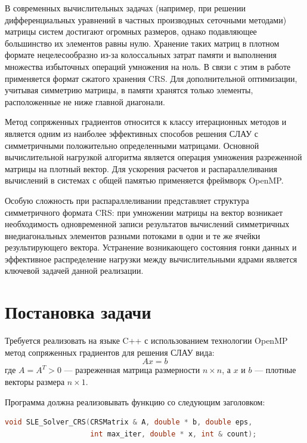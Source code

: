 \documentclass[12pt, a4paper]{article}
\begin{document}
В современных вычислительных задачах (например, при решении дифференциальных уравнений в частных производных сеточными методами) 
матрицы систем достигают огромных размеров, однако подавляющее большинство их элементов равны нулю. 
Хранение таких матриц в плотном формате нецелесообразно из-за колоссальных затрат памяти и 
выполнения множества избыточных операций умножения на ноль. В связи с этим в работе применяется формат сжатого хранения CRS. 
Для дополнительной оптимизации, учитывая симметрию матрицы, 
в памяти хранятся только элементы, расположенные не ниже главной диагонали.

Метод сопряженных градиентов относится к классу итерационных методов и является одним из наиболее эффективных способов решения СЛАУ с симметричными положительно определенными матрицами. 
Основной вычислительной нагрузкой алгоритма является операция умножения разреженной матрицы на плотный вектор. 
Для ускорения расчетов и распараллеливания вычислений в системах с общей памятью применяется фреймворк OpenMP. 

Особую сложность при распараллеливании представляет структура симметричного формата CRS: при умножении матрицы на вектор возникает необходимость одновременной записи результатов вычислений симметричных 
внедиагональных элементов разными потоками в одни и те же ячейки результирующего вектора. Устранение возникающего состояния гонки данных и эффективное распределение нагрузки между вычислительными 
ядрами является ключевой задачей данной реализации.

\section{Постановка задачи}
Требуется реализовать на языке C++ с использованием технологии OpenMP метод сопряженных градиентов для решения СЛАУ вида:
\begin{equation}
    Ax = b
\end{equation}
где $A = A^T > 0$ — разреженная матрица размерности $n \times n$, а $x$ и $b$ — плотные векторы размера $n \times 1$.

Программа должна реализовывать функцию со следующим заголовком:
\begin{lstlisting}[language=C++, frame=single]
void SLE_Solver_CRS(CRSMatrix & A, double * b, double eps, 
                    int max_iter, double * x, int & count);
\end{lstlisting}
\end{document}
